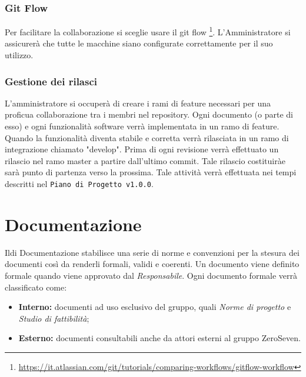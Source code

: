 \subsubsection{Git Flow}
Per facilitare la collaborazione si sceglie usare il git flow \footnote{\url{https://it.atlassian.com/git/tutorials/comparing-workflows/gitflow-workflow}}. L'Amministratore si assicurerà che tutte le macchine siano configurate correttamente per il suo utilizzo.
\subsubsection{Gestione dei rilasci}
L'amministratore si occuperà di creare i rami di feature necessari per una proficua collaborazione tra i membri nel repository. Ogni documento (o parte di esso) e ogni funzionalità software verrà implementata in un ramo di feature. Quando la funzionalità diventa stabile e corretta verrà rilasciata in un ramo di integrazione chiamato "develop". Prima di ogni revisione verrà effettuato un rilascio nel ramo master a partire dall'ultimo commit. Tale rilascio costituiràe sarà punto di partenza verso la prossima. Tale attività verrà effettuata nei tempi descritti nel \texttt{Piano di Progetto v1.0.0}. 

\section{Documentazione}
Ildi Documentazione stabilisce una serie di norme e convenzioni per la stesura dei documenti così da renderli formali, validi e coerenti.
Un documento viene definito formale quando viene approvato dal \textit{Responsabile}.
Ogni documento formale verrà classificato come:
\begin{itemize}
	\item \textbf{Interno:} documenti ad uso esclusivo del gruppo, quali \textit{Norme di progetto} e \textit{Studio di fattibilità};
	\item \textbf{Esterno:} documenti consultabili anche da attori esterni al gruppo ZeroSeven.
	
\end{itemize}

